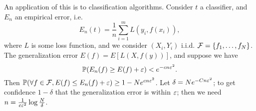 An application of this is to classification algorithms. Consider $t$ a classifier, and $E_n$ an empirical error, i.e.
\[ E_n(t) = \frac{1}{n} \sum_{i=1}^m L(y_i, f(x_i)), \]
where $L$ is some loss function, and we consider $(X_i, Y_i)$ i.i.d. $\mathcal F = \{f_1, \dots, f_N\}$. The generalization error $E(f) = E[L(X, f(y))]$, and suppose we have
\[ \mathbb P(E_n(f) \geq E(f) + \varepsilon) < e^{-c n \varepsilon^2}. \]
Then $\mathbb P(\forall f \in \mathcal F, E(f) \leq E_n(f) + \varepsilon) \geq 1 - Ne^{c n \varepsilon^2}$. Let $\delta = Ne^{-C n \varepsilon^2}$; to get confidence $1 - \delta$ that the generalization error is within $\varepsilon$; then we need $n = \frac{1}{c \varepsilon^2} \log \frac{N}{\delta}$. 

